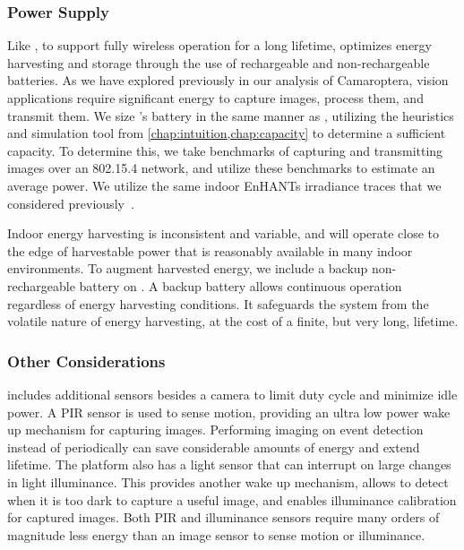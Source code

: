 \subsubsection{Power Supply}
Like \name, to support fully wireless operation for a long lifetime, \namec optimizes energy harvesting and storage through the use of rechargeable and non-rechargeable batteries.
As we have explored previously in our analysis of Camaroptera, vision applications require significant energy to capture images, process them, and transmit them. 
We size \namec's battery in the same manner as \name, utilizing the heuristics and simulation tool from \cref{chap:intuition,chap:capacity} to determine a sufficient capacity.
To determine this, we take benchmarks of capturing and transmitting images over an 802.15.4 network, and utilize these benchmarks to estimate an average power.
We utilize the same indoor EnHANTs irradiance traces that we considered previously~\cite{gorlatova2013networking}.

Indoor energy harvesting is inconsistent and variable, and \namec will operate close to the edge of harvestable power that is reasonably available in many indoor environments.
To augment harvested energy, we include a backup non-rechargeable battery on \namec. A backup battery allows continuous operation regardless of energy harvesting conditions. 
It safeguards the system from the volatile nature of energy harvesting, at the cost of a finite, but very long, lifetime.

\subsubsection{Other Considerations}
\namec includes additional sensors besides a camera to limit duty cycle and minimize idle power. A PIR sensor is used to sense motion, providing an ultra low power wake up mechanism for capturing images. Performing imaging on event detection instead of periodically can save considerable amounts of energy and extend lifetime. The platform also has a light sensor that can interrupt on large changes in light illuminance. This provides another wake up mechanism, allows \namec to detect when it is too dark to capture a useful image, and enables illuminance calibration for captured images. Both PIR and illuminance sensors require many orders of magnitude less energy than an image sensor to sense motion or illuminance.

